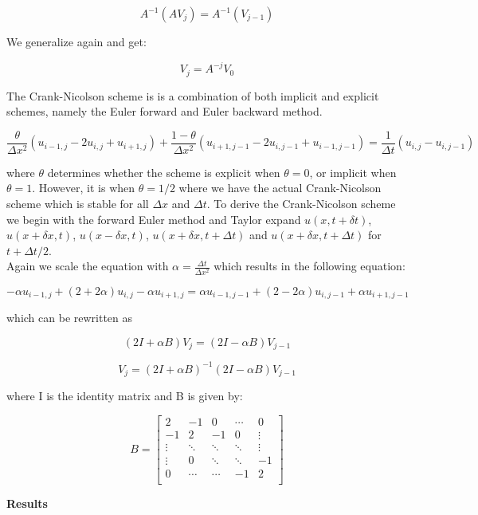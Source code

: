 \documentclass[10pt,a4paper]{article}
\begin{document}
$$
A^{-1}(AV_j) = A^{-1}(V_{j-1})
$$

\noindent We generalize again and get:

$$
V_j = A^{-j}V_0
$$

\noindent The Crank-Nicolson scheme is is a combination of both implicit and explicit schemes, namely the Euler forward and Euler backward method.

$$
\frac{\theta}{\Delta x^2}(u_{i-1,j} - 2u_{i,j} + u_{i+1,j}) + \frac{1 - \theta}{\Delta x^2}(u_{i+1,j-1} - 2u_{i,j-1} + u_{i-1,j-1}) = \frac{1}{\Delta t}(u_{i,j} - u_{i,j-1})
$$

\noindent where $\theta$ determines whether the scheme is explicit when $\theta = 0$, or implicit when $\theta = 1$. However, it is when $\theta = 1/2$ where we have the actual Crank-Nicolson scheme which is stable for all $\Delta x$ and $\Delta t$. To derive the Crank-Nicolson scheme we begin with the forward Euler method and Taylor expand $u(x,t + \delta t)$, $u(x + \delta x,t)$, $u(x - \delta x,t)$, $u(x + \delta x, t + \Delta t)$ and $u(x + \delta x, t + \Delta t)$ for $t + \Delta t/2$.\\

\noindent Again we scale the equation with $\alpha = \frac{\Delta t}{\Delta x^2}$ which results in the following equation:

$$
-\alpha u_{i-1,j} + (2 + 2\alpha)u_{i,j} -\alpha u_{i+1,j} = \alpha u_{i-1,j-1} + (2-2\alpha)u_{i,j-1} + \alpha u_{i+1,j-1}
$$

\noindent which can be rewritten as

$$
(2I + \alpha B)V_j = (2I - \alpha B)V_{j-1}
$$

$$
V_j = (2I + \alpha B)^{-1}(2I - \alpha B)V_{j-1}
$$

\noindent where I is the identity matrix and B is given by:

$$
B = \begin{bmatrix}
2 & -1 & 0 & \cdots &0\\
-1 & 2 & -1 & 0 & \vdots\\
\vdots & \ddots & \ddots & \ddots & \vdots\\
\vdots & 0 & \ddots & \ddots & -1\\
0 & \cdots & \cdots & -1 & 2\\

\end{bmatrix}
$$






\newpage
{\LARGE\bf
Results
}\\
\end{document}
